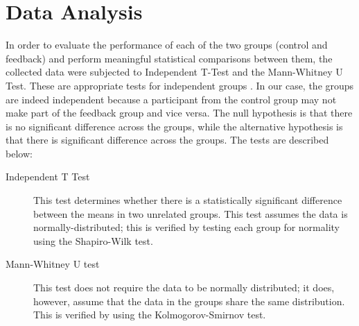 \section{Data Analysis}
\label{sec:meth-data-analysis}
In order to evaluate the performance of each of the two groups (control and feedback) and perform meaningful statistical comparisons between them, the collected data were subjected to Independent T-Test and the Mann-Whitney U Test. These are appropriate tests for independent groups \cite{de2015statsref}. In our case, the groups are indeed independent because a participant from the control group may not make part of the feedback group and vice versa. The null hypothesis is that there is no significant difference across the groups, while the alternative hypothesis is that there is significant difference across the groups. The tests are described below:


\begin{description}
	\item[Independent T Test] This test determines whether there is a statistically significant difference between the means in two unrelated groups. This test assumes the data is normally-distributed; this is verified by testing each group for normality using the Shapiro-Wilk\cite{xxx} test.
	
%	
	\item[Mann-Whitney U test] This test does not require the data to be normally distributed; it does, however, assume that the data in the groups share the same distribution. This is verified by using the Kolmogorov-Smirnov \cite{xxx} test.
	
\end{description}
	
